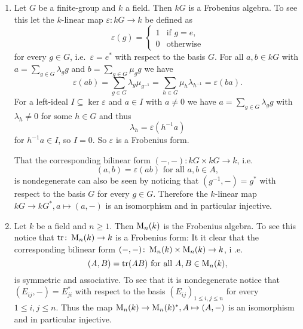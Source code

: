 \begin{expls}
 \begin{enumerate}[label=\emph{\alph*)},leftmargin=*]
  \item
   Let $G$ be a finite-group and $k$ a field. Then $kG$ is a Frobenius algebra. To see this let the $k$-linear map $\varepsilon \colon kG \to k$ be defined as
   \[
    \varepsilon(g) =
    \begin{cases}
     1 & \text{if } g = e, \\
     0 & \text{otherwise}
    \end{cases}
   \]
   for every $g \in G$, i.e.\ $\varepsilon = e^*$ with respect to the basis $G$. For all $a,b \in kG$ with $a = \sum_{g \in G} \lambda_g g$ and $b = \sum_{g \in G} \mu_g g$ we have
   \[
    \varepsilon(ab)
    = \sum_{g \in G} \lambda_g \mu_{g^{-1}}
    = \sum_{h \in G} \mu_h \lambda_{h^{-1}}
    =  \varepsilon(ba).
   \]
   For a left-ideal $I \subseteq \ker \varepsilon$ and $a \in I $ with $a \neq 0$ we have $a = \sum_{g \in G} \lambda_g g$ with $\lambda_h \neq 0$ for some $h \in G$ and thus
   \[
    \lambda_h = \varepsilon\left( h^{-1} a \right)
   \]
   for $h^{-1} a \in I$, so $I = 0$. So $\varepsilon$ is a Frobenius form.
   
   That the corresponding bilinear form $(-,-) \colon kG \times kG \to k$, i.e.\
   \[
    (a,b) = \varepsilon(ab) \text{ for all } a,b \in A,
   \]
   is nondegenerate can also be seen by noticing that $(g^{-1},-) = g^*$ with respect to the basis $G$ for every $g \in G$. Therefore the $k$-linear map $kG \to kG^*, a \mapsto (a,-)$ is an isomorphism and in particular injective.
  \item
   Let $k$ be a field and $n \geq 1$. Then $\operatorname{M}_n(k)$ is the Frobenius algebra. To see this notice that $\operatorname{tr} \colon \operatorname{M}_n(k) \to k$ is a Frobenius form: It it clear that the corresponding bilinear form $(-,-) \colon \operatorname{M}_n(k) \times \operatorname{M}_n(k) \to k$, i .e.\
   \[
    (A,B) = \operatorname{tr}(AB) \text{ for all } A,B \in \operatorname{M}_n(k),
   \]
   is symmetric and associative. To see that it is nondegenerate notice that $(E_{ij}, -) = E_{ji}^*$ with respect to the basis $(E_{ij})_{1 \leq i,j \leq n}$ for every $1 \leq i,j \leq n$. Thus the map $\operatorname{M}_n(k) \to \operatorname{M}_n(k)^*, A \mapsto (A,-)$ is an isomorphism and in particular injective.
 \end{enumerate}
\end{expls}



